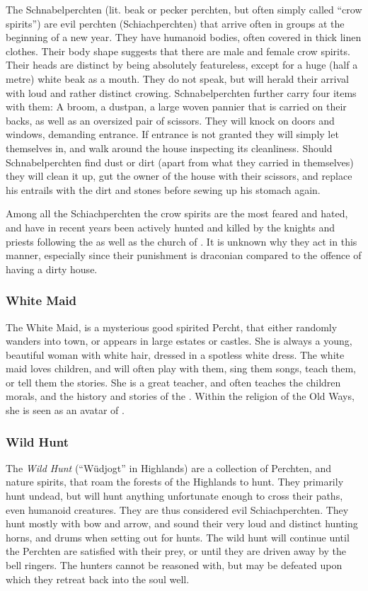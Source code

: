 The Schnabelperchten (lit. beak or pecker perchten, but often simply called
``crow spirits'') are evil perchten (Schiachperchten) that arrive often in
groups at the beginning of a new year. They have humanoid bodies, often
covered in thick linen clothes. Their body shape suggests that there are male
and female crow spirits. Their heads are distinct by being absolutely
featureless, except for a huge (half a metre) white beak as a mouth. They do
not speak, but will herald their arrival with loud and rather distinct
crowing. Schnabelperchten further carry four items with them: A broom, a
dustpan, a large woven pannier that is carried on their backs, as well as an
oversized pair of scissors. They will knock on doors and windows, demanding
entrance. If entrance is not granted they will simply let themselves in, and
walk around the house inspecting its cleanliness. Should Schnabelperchten find
dust or dirt (apart from what they carried in themselves) they will clean it
up, gut the owner of the house with their scissors, and replace his entrails
with the dirt and stones before sewing up his stomach again.

Among all the Schiachperchten the crow spirits are the most feared and hated,
and have in recent years been actively hunted and killed by the knights and
priests following the  as well as the church of
. It is unknown why they act in this manner, especially since
their punishment is draconian compared to the offence of having a dirty house.

\subsubsection{White Maid}
\label{sec:White Maid}

The White Maid, is a mysterious good spirited Percht, that either randomly
wanders into town, or appears in large estates or castles. She is always a
young, beautiful woman with white hair, dressed in a spotless white dress. The
white maid loves children, and will often play with them, sing them songs,
teach them, or tell them the stories. She is a great teacher, and often
teaches the children morals, and the history and stories of the
. Within the religion of the Old Ways, she is seen as an
avatar of .

\subsubsection{Wild Hunt}
\label{sec:Wild Hunt}

The \emph{Wild Hunt} (``Wüdjogt'' in Highlands) are a collection of Perchten,
and nature spirits, that roam the forests of the Highlands to hunt. They
primarily hunt undead, but will hunt anything unfortunate enough to cross
their paths, even humanoid creatures. They are thus considered evil
Schiachperchten. They hunt mostly with bow and arrow, and sound their very loud
and distinct hunting horns, and drums when setting out for hunts. The wild hunt
will continue until the Perchten are satisfied with their prey, or until they
are driven away by the bell ringers. The hunters cannot be reasoned with, but
may be defeated upon which they retreat back into the soul well.
